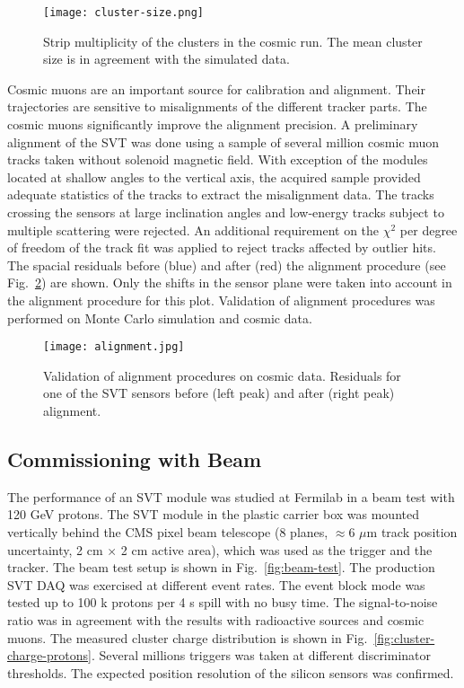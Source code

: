 \begin{figure}[hbt] 
\centering 
\texttt{[image: cluster-size.png]}
\caption{Strip multiplicity of the clusters in the cosmic run. The mean cluster size is in agreement with the simulated data.}
\label{fig:cluster-size}
\end{figure}

Cosmic muons are an important source for calibration and alignment. Their trajectories are sensitive to misalignments of the different tracker parts. The cosmic muons significantly improve the alignment precision. A preliminary alignment of the SVT was done using a sample of several million cosmic muon tracks taken without solenoid magnetic field. With exception of the modules located at shallow angles to the vertical axis, the acquired sample provided adequate statistics of the tracks to extract the misalignment data. The tracks crossing the sensors at large inclination angles and low-energy tracks subject to multiple scattering were rejected. An additional requirement on the $\chi^2$ per degree of freedom of the track fit was applied to reject tracks affected by outlier hits. The spacial residuals before (blue) and after (red) the alignment procedure (see Fig.~\ref{fig:alignment}) are shown. Only the shifts in the sensor plane were taken into account in the alignment procedure for this plot. Validation of alignment procedures was performed on Monte Carlo simulation and cosmic data.

\begin{figure}[hbt] 
\centering 
\texttt{[image: alignment.jpg]}
\caption{Validation of alignment procedures on cosmic data. Residuals for one of the SVT sensors before (left peak) and after (right peak) alignment.}
\label{fig:alignment}
\end{figure}

\subsection{Commissioning with Beam}

The performance of an SVT module was studied at Fermilab in a beam test with 120 GeV protons. The SVT module in the plastic carrier box was mounted vertically behind the CMS pixel beam telescope (8 planes, $\approx$6 $\mu$m track position uncertainty, 2 cm $\times$ 2 cm active area), which was used as the trigger and the tracker. The beam test setup is shown in Fig.~\ref{fig:beam-test}. The production SVT DAQ was exercised at different event rates. The event block mode was tested up to 100 k protons per 4 s spill with no busy time. The signal-to-noise ratio was in agreement with the results with radioactive sources and cosmic muons. The measured cluster charge distribution is shown in Fig.~\ref{fig:cluster-charge-protons}. Several millions triggers was taken at different discriminator thresholds.  The expected position resolution of the silicon sensors was confirmed. 

